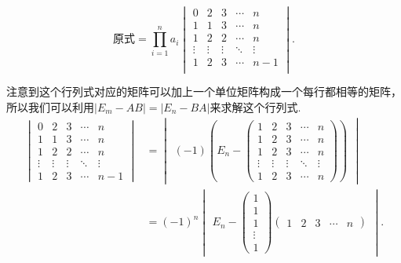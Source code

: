 \documentclass[12pt,fontset=fandol]{ctexart}
\begin{document}
\begin{solve}
\[ \text{原式}=\prod_{i=1}^na_i \begin{vmatrix}
                0      & 2      & 3      & \cdots & n      \\
                1      & 1      & 3      & \cdots & n      \\
                1      & 2      & 2      & \cdots & n      \\
                \vdots & \vdots & \vdots & \ddots & \vdots \\
                1      & 2      & 3      & \cdots & n-1    \\
            \end{vmatrix}. \]

            注意到这个行列式对应的矩阵可以加上一个单位矩阵构成一个每行都相等的矩阵，所以我们可以利用$|E_m-AB|=|E_n-BA|$来求解这个行列式.
            \begin{align*}
                \begin{vmatrix}
                    0      & 2      & 3      & \cdots & n      \\
                    1      & 1      & 3      & \cdots & n      \\
                    1      & 2      & 2      & \cdots & n      \\
                    \vdots & \vdots & \vdots & \ddots & \vdots \\
                    1      & 2      & 3      & \cdots & n-1
                \end{vmatrix}
                & = \begin{vmatrix}(-1)\left(E_n-\begin{pmatrix}
                        1      & 2      & 3      & \cdots & n      \\
                        1      & 2      & 3      & \cdots & n      \\
                        1      & 2      & 3      & \cdots & n      \\
                        \vdots & \vdots & \vdots & \ddots & \vdots \\
                        1      & 2      & 3      & \cdots & n
                    \end{pmatrix}\right)\end{vmatrix} \\
                & =(-1)^n\begin{vmatrix}E_n-
                            \begin{pmatrix}
                        1 \\1\\1\\\vdots\\1
                    \end{pmatrix}\begin{pmatrix}1 & 2 & 3 & \cdots & n\end{pmatrix}\end{vmatrix}.
            \end{align*}


\end{solve}
\end{document}
